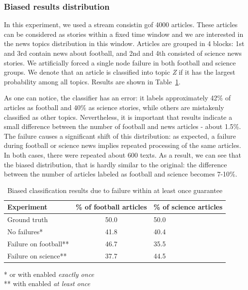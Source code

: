 \subsubsection{Biased results distribution}

In this experiment, we used a stream consistin gof  4000 articles. These articles can be considered as stories within a fixed time window and we are interested in the news topics distribution in this window. Articles are grouped in 4 blocks: 1st and 3rd contain news about football, and 2nd and 4th consisted of science news stories. We artificially forced a  single node failure in both football and science groups. We denote that an article is classified into topic {\em Z} if it has the largest probability among all topics. Results are shown in Table~\ref{biased_results}.

 As one can notice, the classifier has an error: 
it labels approximately 42\% of articles as football and 40\% as science stories, while others are mistakenly classified as other topics. Nevertheless, it is important that results indicate a small difference between the number of football and news articles - about 1.5\%. The failure causes a significant shift of this distribution: as expected, a failure during football or science news implies repeated processing of the same articles. In both cases, there were repeated about 600 texts. As a result, we can see that the biased distribution, that is hardly similar to the original: the difference between the number of articles labeled as football and science becomes 7-10\%. 

\begin{table}[htbp]
\caption{Biased classification results due to failure within at least once guarantee}
\begin{threeparttable}
\begin{tabular}{lcl}
Experiment    & \% of football articles & \% of science articles    \\
\hline
Ground truth   &   50.0    &   50.0    \\
No failures*   &   41.8    &   40.4    \\
Failure on football**   &   46.7    &   35.5    \\
Failure on science**   &   37.7    &   44.5    \\
\end{tabular}
* or with enabled {\em exactly once} \\
** with enabled {\em at least once}
\end{threeparttable}
\label{biased_results}
\end{table}

